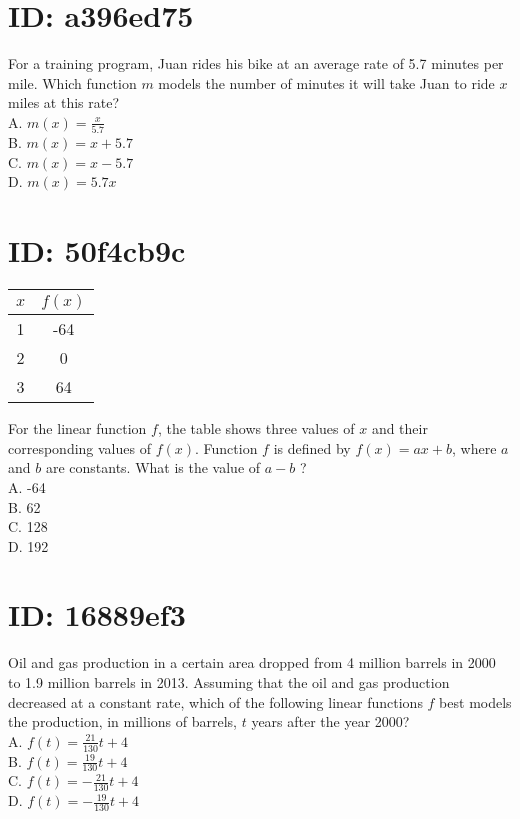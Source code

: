 \section*{ID: a396ed75}
For a training program, Juan rides his bike at an average rate of 5.7 minutes per mile. Which function $m$ models the number of minutes it will take Juan to ride $x$ miles at this rate?\\
A. $m(x)=\frac{x}{5.7}$\\
B. $m(x)=x+5.7$\\
C. $m(x)=x-5.7$\\
D. $m(x)=5.7 x$

\section*{ID: 50f4cb9c}
\begin{center}
\begin{tabular}{|c|c|}
\hline
$x$ & $f(x)$ \\
\hline
1 & -64 \\
\hline
2 & 0 \\
\hline
3 & 64 \\
\hline
\end{tabular}
\end{center}

For the linear function $f$, the table shows three values of $x$ and their corresponding values of $f(x)$. Function $f$ is defined by $f(x)=a x+b$, where $a$ and $b$ are constants. What is the value of $a-b$ ?\\
A. -64\\
B. 62\\
C. 128\\
D. 192

\section*{ID: 16889ef3}
Oil and gas production in a certain area dropped from 4 million barrels in 2000 to 1.9 million barrels in 2013. Assuming that the oil and gas production decreased at a constant rate, which of the following linear functions $f$ best models the production, in millions of barrels, $t$ years after the year 2000?\\
A. $f(t)=\frac{21}{130} t+4$\\
B. $f(t)=\frac{19}{130} t+4$\\
C. $f(t)=-\frac{21}{130} t+4$\\
D. $f(t)=-\frac{19}{130} t+4$

